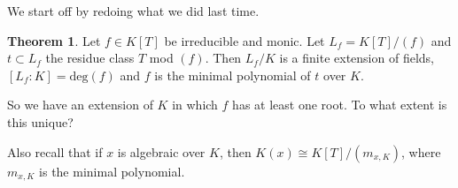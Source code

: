 \documentclass{article}
\theoremstyle{definition}
\newtheorem{theorem}{Theorem}[section]
\begin{document}
\vspace{1mm}

We start off by redoing what we did last time.

\begin{theorem}
    Let $f \in K[T]$ be irreducible and monic. Let $L_f = K[T]/(f)$ and $t \subset L_f$ the residue class $T$ mod $(f)$. Then $L_f/K$ is a finite extension of fields, $[L_f : K] = \text{deg}(f)$ and $f$ is the minimal polynomial of $t$ over $K$. 
\end{theorem}
So we have an extension of $K$ in which $f$ has at least one root. To what extent is this unique?

Also recall that if $x$ is algebraic over $K$, then $K(x) \cong K[T]/(m_{x,K})$, where $m_{x,K}$ is the minimal polynomial.
\end{document}
